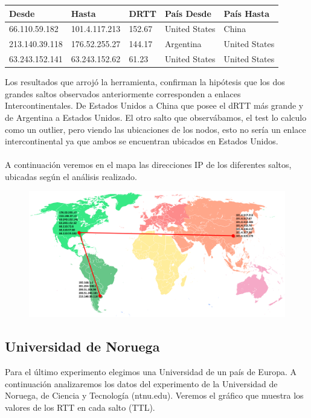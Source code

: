 \begin{center}
    \begin{tabular}{| l | l | l | l | l | }
    \hline
    Desde                & Hasta                  & DRTT    & País Desde     & País Hasta    \\ \hline
   66.110.59.182    &  101.4.117.213    & 152.67  & United States & China              \\ \hline
   213.140.39.118  & 	176.52.255.27    & 144.17 & Argentina       & United States  \\ \hline
   63.243.152.141  &  63.243.152.62     & 61.23   & United States  & United States \\ \hline
  \end{tabular}
\end{center}

Los resultados que arrojó la herramienta, confirman la hipótesis que los dos grandes saltos observados anteriormente corresponden a enlaces Intercontinentales. De Estados Unidos a China que posee el dRTT más grande y de Argentina a Estados Unidos.
El otro salto que observábamos, el test lo calculo como un outlier, pero viendo las ubicaciones de los nodos, esto no sería un enlace intercontinental ya que ambos se encuentran ubicados en Estados Unidos. 
\\\\
A continuación veremos en el mapa las direcciones IP de los diferentes saltos, ubicadas según el análisis realizado.

\FloatBarrier

\begin{figure}[ht!]
  \centering
   \includegraphics[width=1.0\textwidth]{imagenes/mapaCHI.png}
\end{figure}

\FloatBarrier

\subsection{Universidad de Noruega}
Para el último experimento elegimos una Universidad de un país de Europa.
A continuación analizaremos los datos del experimento de la Universidad de Noruega, de Ciencia y Tecnología (ntnu.edu). 
Veremos el gráfico que muestra los valores de los RTT en cada salto (TTL).

